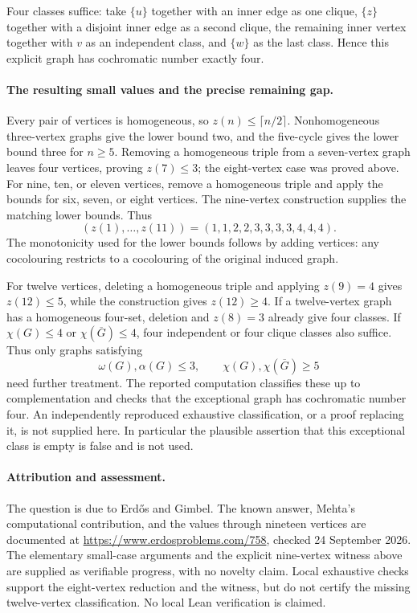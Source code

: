 Four classes suffice: take \(\{u\}\) together with an inner edge as one clique, \(\{z\}\) together with a disjoint inner edge as a second clique, the remaining inner vertex together with \(v\) as an independent class, and \(\{w\}\) as the last class. Hence this explicit graph has cochromatic number exactly four.

\paragraph{The resulting small values and the precise remaining gap.}
Every pair of vertices is homogeneous, so \(z(n)\leq\lceil n/2\rceil\). Nonhomogeneous three-vertex graphs give the lower bound two, and the five-cycle gives the lower bound three for \(n\geq5\). Removing a homogeneous triple from a seven-vertex graph leaves four vertices, proving \(z(7)\leq3\); the eight-vertex case was proved above. For nine, ten, or eleven vertices, remove a homogeneous triple and apply the bounds for six, seven, or eight vertices. The nine-vertex construction supplies the matching lower bounds. Thus
\[
 (z(1),\ldots,z(11))=(1,1,2,2,3,3,3,3,4,4,4).
\]
The monotonicity used for the lower bounds follows by adding vertices: any cocolouring restricts to a cocolouring of the original induced graph.

For twelve vertices, deleting a homogeneous triple and applying \(z(9)=4\) gives \(z(12)\leq5\), while the construction gives \(z(12)\geq4\). If a twelve-vertex graph has a homogeneous four-set, deletion and \(z(8)=3\) already give four classes. If \(\chi(G)\leq4\) or \(\chi(\overline G)\leq4\), four independent or four clique classes also suffice. Thus only graphs satisfying
\[
 \omega(G),\alpha(G)\leq3,\qquad
 \chi(G),\chi(\overline G)\geq5
\]
need further treatment. The reported computation classifies these up to complementation and checks that the exceptional graph has cochromatic number four. An independently reproduced exhaustive classification, or a proof replacing it, is not supplied here. In particular the plausible assertion that this exceptional class is empty is false and is not used.

\paragraph{Attribution and assessment.}
The question is due to Erd\H{o}s and Gimbel. The known answer, Mehta's computational contribution, and the values through nineteen vertices are documented at \url{https://www.erdosproblems.com/758}, checked 24 September 2026. The elementary small-case arguments and the explicit nine-vertex witness above are supplied as verifiable progress, with no novelty claim. Local exhaustive checks support the eight-vertex reduction and the witness, but do not certify the missing twelve-vertex classification. No local Lean verification is claimed.

